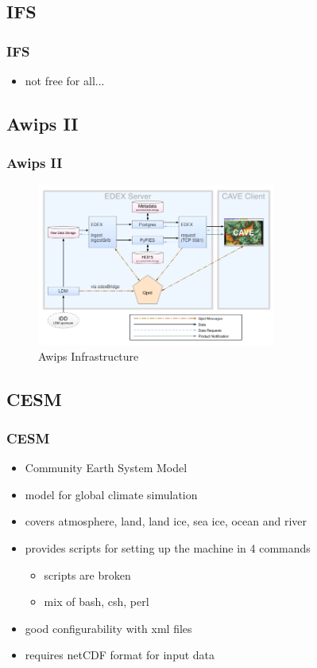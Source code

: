 \documentclass[compress]{beamer}
\begin{document}
\subsection{IFS}
\begin{frame}
	\frametitle{IFS}
	\begin{itemize}
		\item not free for all...
	\end{itemize}
\end{frame}

\subsection{Awips II}
\begin{frame}
    \frametitle{Awips II}
    \begin{center}
    	\begin{figure}
			\includegraphics[width=0.7\textwidth]{gfx/awipsII.png}
      	  	\caption[]{Awips Infrastructure \cite{Uni01}}
		\end{figure}
	\end{center}

\end{frame}

\subsection{CESM}
\begin{frame}
    \frametitle{CESM}
    	\begin{itemize}
    	    \item Community Earth System Model
			\item model for global climate simulation
			\item covers atmosphere, land, land ice, sea ice, ocean and river
			\item provides scripts for setting up the machine in 4 commands
	    	\begin{itemize}
		    	\item scripts are broken
		    	\item mix of bash, csh, perl
		    \end{itemize}
		    \item good configurability with xml files
		    \item requires netCDF format for input data \cite{CESMDocs}
		\end{itemize}
\end{frame}
\end{document}
